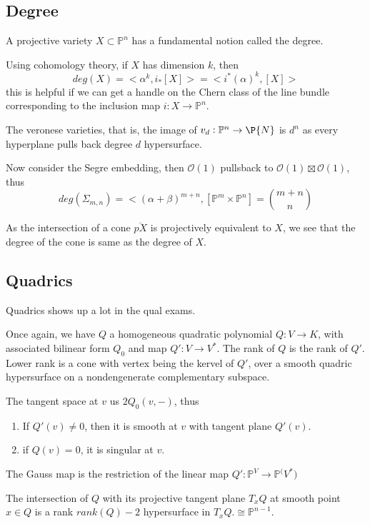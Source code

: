 \documentclass[main.tex]{subfiles}
\newcommand{\Pn}[1]{\mathbb{P}^{#1}}
\begin{document}
\subsection{Degree}
A projective variety $X \subset \Pn{n}$ has a fundamental notion called the degree.

Using cohomology theory, if $X$ has dimension $k$, then 
$$
deg(X) = <\alpha^k, i_*[X]> = <i^*(\alpha)^k, [X]>
$$
this is helpful if we can get a handle on the Chern class of the line bundle corresponding to the inclusion map $i: X \rightarrow \Pn{n}$.
\begin{example}
The veronese varieties, that is, the image of $v_d: \Pn{n} \rightarrow \P{N}$ is $d^n$ as every hyperplane pulls back degree $d$ hypersurface.
\end{example}

\begin{example}
Now consider the Segre embedding, then $\mathcal{O}(1)$ pullsback to $\mathcal{O}(1) \boxtimes \mathcal{O}(1)$, thus 
$$
deg(\Sigma_{m,n}) = <(\alpha + \beta)^{m+n}, [\Pn{m} \times \Pn{n}] = \binom{m+n}{n}
$$
\end{example}

\begin{example}
As the intersection of a cone $\overline{pX}$ is projectively equivalent to $X$, we see that the degree of the cone is same as the degree of $X$.
\end{example}
\subsection{Quadrics}
Quadrics shows up a lot in the qual exams. 

Once again, we have $Q$ a homogeneous quadratic polynomial $Q: V \rightarrow K$, with associated bilinear form $Q_0$ and map $Q': V \rightarrow V^*$. The rank of $Q$ is the rank of $Q'$. Lower rank is a cone with vertex being the kervel of $Q'$, over a smooth quadric hypersurface on a nondengenerate complementary subspace.

The tangent space at $v$ us $2Q_0(v, -)$, thus \begin{enumerate}
    \item If $Q'(v) \neq 0$, then it is smooth at $v$ with tangent plane $Q'(v)$.
    \item if $Q(v) = 0$, it is singular at $v$.
\end{enumerate}
The Gauss map is the restriction of the linear map $Q': \Pn{V} \rightarrow \Pn(V^*)$

The intersection of $Q$ with its projective tangent plane $T_x Q$ at smooth point $x \in Q$ is a rank $rank(Q)-2$ hypersurface in $T_x Q. \cong \Pn{n-1}$.
\end{document}

